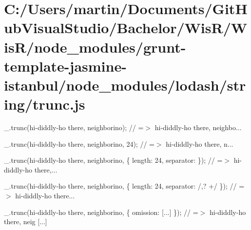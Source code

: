 \hypertarget{_c_1_2_users_2martin_2_documents_2_git_hub_visual_studio_2_bachelor_2_wis_r_2_wis_r_2node_module80334f34be64a6bf5e7948bee54401ff}{}\section{C\+:/\+Users/martin/\+Documents/\+Git\+Hub\+Visual\+Studio/\+Bachelor/\+Wis\+R/\+Wis\+R/node\+\_\+modules/grunt-\/template-\/jasmine-\/istanbul/node\+\_\+modules/lodash/string/trunc.\+js}
\+\_\+.\+trunc(\textquotesingle{}hi-\/diddly-\/ho there, neighborino\textquotesingle{}); // =$>$ \textquotesingle{}hi-\/diddly-\/ho there, neighbo...\textquotesingle{}

\+\_\+.\+trunc(\textquotesingle{}hi-\/diddly-\/ho there, neighborino\textquotesingle{}, 24); // =$>$ \textquotesingle{}hi-\/diddly-\/ho there, n...\textquotesingle{}

\+\_\+.\+trunc(\textquotesingle{}hi-\/diddly-\/ho there, neighborino\textquotesingle{}, \{ \textquotesingle{}length\textquotesingle{}\+: 24, \textquotesingle{}separator\textquotesingle{}\+: \textquotesingle{} \textquotesingle{} \}); // =$>$ \textquotesingle{}hi-\/diddly-\/ho there,...\textquotesingle{}

\+\_\+.\+trunc(\textquotesingle{}hi-\/diddly-\/ho there, neighborino\textquotesingle{}, \{ \textquotesingle{}length\textquotesingle{}\+: 24, \textquotesingle{}separator\textquotesingle{}\+: /,? +/ \}); // =$>$ \textquotesingle{}hi-\/diddly-\/ho there...\textquotesingle{}

\+\_\+.\+trunc(\textquotesingle{}hi-\/diddly-\/ho there, neighborino\textquotesingle{}, \{ \textquotesingle{}omission\textquotesingle{}\+: \textquotesingle{} \mbox{[}...\mbox{]}\textquotesingle{} \}); // =$>$ \textquotesingle{}hi-\/diddly-\/ho there, neig \mbox{[}...\mbox{]}\textquotesingle{}


